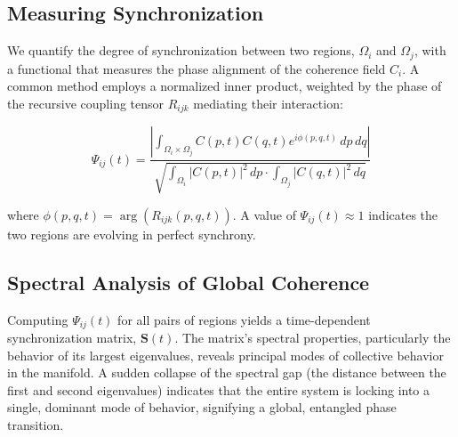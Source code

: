 
\subsection{Measuring Synchronization}
\label{11.4.1:measuring_synchronization}

We quantify the degree of synchronization between two regions, \(\Omega_i\) and \(\Omega_j\), with a functional that measures the phase alignment of the coherence field \(C_i\). A common method employs a normalized inner product, weighted by the phase of the recursive coupling tensor \(R_{ijk}\) mediating their interaction:

\begin{equation}
\Psi_{ij}(t) = \frac{\left|\int_{\Omega_i \times \Omega_j} C(p,t)C(q,t)e^{i\phi(p,q,t)} \, dp \, dq\right|}{\sqrt{\int_{\Omega_i} |C(p,t)|^2 \, dp \cdot \int_{\Omega_j} |C(q,t)|^2 \, dq}}
\end{equation}

where \(\phi(p,q,t) = \arg(R_{ijk}(p,q,t))\). A value of \(\Psi_{ij}(t) \approx 1\) indicates the two regions are evolving in perfect synchrony.


\subsection{Spectral Analysis of Global Coherence}
\label{11.4.2:spectral_analysis_of_global_coherence}

Computing \(\Psi_{ij}(t)\) for all pairs of regions yields a time-dependent synchronization matrix, \(\mathbf{S}(t)\). The matrix's spectral properties, particularly the behavior of its largest eigenvalues, reveals principal modes of collective behavior in the manifold. A sudden collapse of the spectral gap (the distance between the first and second eigenvalues) indicates that the entire system is locking into a single, dominant mode of behavior, signifying a global, entangled phase transition. 